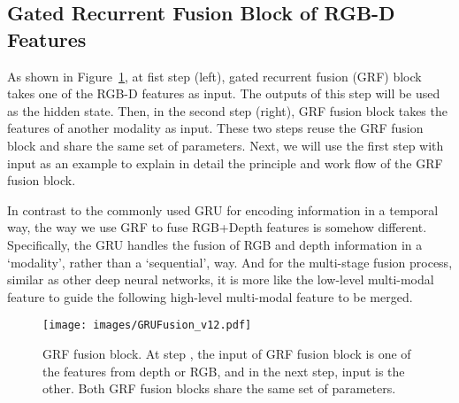 \documentclass[10pt,twocolumn,letterpaper]{article}
\begin{document}
\subsection{Gated Recurrent Fusion Block of RGB-D Features}


As shown in Figure~\ref{fig:GRUFusion}, at fist step (left), gated recurrent fusion (GRF) block takes one of the RGB-D features as input.
The outputs of this step will be used as the hidden state.
Then, in the second step (right), GRF fusion block takes the features of another modality as input. These two steps reuse the GRF fusion block and share the same set of parameters.
Next, we will use the first step with input  as an example to explain in detail the principle and work flow of the GRF fusion block. 

In contrast to the commonly used GRU for encoding information in a temporal way, the way we use GRF to fuse RGB+Depth features is somehow different. Specifically, the GRU handles the fusion of RGB and depth information in a `modality', 
rather than a `sequential', way. 
And for the multi-stage fusion process, similar as other deep neural networks, it is more like the low-level multi-modal feature to guide the following high-level multi-modal feature to be merged.


\begin{figure}[t]
\begin{center}   
{
\texttt{[image: images/GRUFusion\_v12.pdf]}
}
\caption{GRF fusion block. At step , the input of GRF fusion block is one of the features from depth or RGB, and in the next step, input is the other. Both GRF fusion blocks share the same set of parameters.}
\vspace{-0.5cm}
\label{fig:GRUFusion}
\end{center}
\end{figure}
\end{document}
